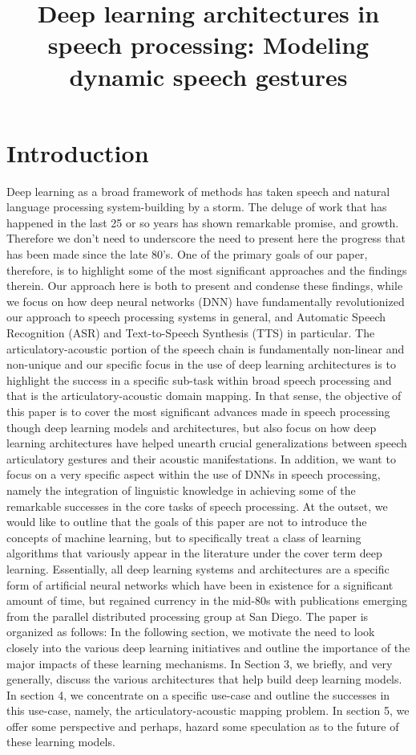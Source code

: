 \documentclass{article}[12pt]
\author{}\title{Deep learning architectures in speech processing: Modeling dynamic speech gestures}
\begin{document}
\maketitle
\section{Introduction}
Deep learning as a broad framework of methods has taken speech and natural language processing system-building by a storm. The deluge of work that has happened in the last 25 or so years has shown remarkable promise, and growth. Therefore we don't need to underscore the need to present here the progress that has been made since the late 80's. One of the primary goals of our paper, therefore, is to highlight some of the most significant approaches and the findings therein. Our approach here is both to present and condense these findings, while we focus on how deep neural networks (DNN) have fundamentally revolutionized our approach to speech processing systems in general, and Automatic Speech Recognition (ASR) and Text-to-Speech Synthesis (TTS) in particular. The articulatory-acoustic portion of the speech chain is fundamentally non-linear and non-unique and our specific focus in the use of deep learning architectures is to highlight the success in a specific sub-task within broad speech processing and that is the articulatory-acoustic domain mapping. In that sense, the objective of this paper is to cover the most significant advances made in speech processing though deep learning models and architectures, but also focus on how deep learning architectures have helped unearth crucial generalizations between speech articulatory gestures and their acoustic manifestations. In addition, we want to focus on a very specific aspect within the use of DNNs in speech processing, namely the integration of linguistic knowledge in achieving some of the remarkable successes in the core tasks of speech processing. At the outset, we would like to outline that the goals of this paper are not to introduce the concepts of machine learning, but to specifically treat a class of learning algorithms that variously appear in the literature under the cover term deep learning. Essentially, all deep learning systems and architectures are a specific form of artificial neural networks which have been in existence for a significant amount of time, but regained currency in the mid-80s with publications emerging from the parallel distributed processing group at San Diego. The paper is organized as follows: In the following section, we motivate the need to look closely into the various deep learning initiatives and outline the importance of the major impacts of these learning mechanisms. In Section 3, we briefly, and very generally, discuss the various architectures that help build deep learning models. In section 4, we concentrate on a specific use-case and outline the successes in this use-case, namely, the articulatory-acoustic mapping problem. In section 5, we offer some perspective and perhaps, hazard some speculation as to the future of these learning models.
\end{document}
